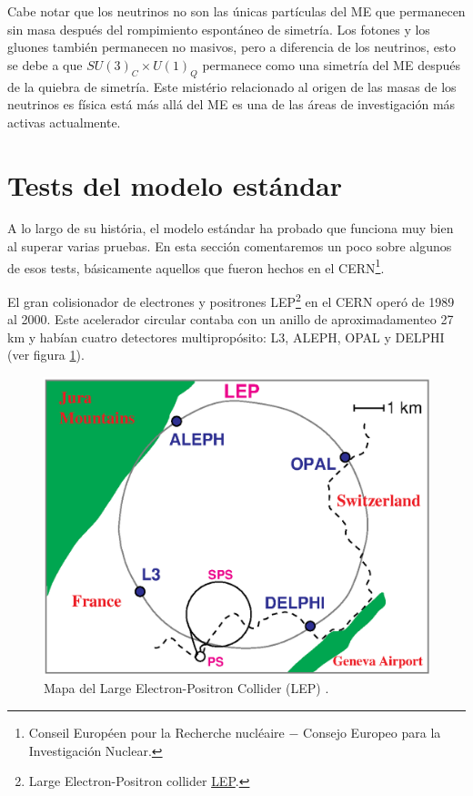  Cabe notar que los neutrinos no son las únicas partículas del ME que permanecen sin masa después del rompimiento espontáneo de simetría. Los fotones y los gluones también permanecen no masivos, pero a diferencia de los neutrinos, esto se debe a que $SU(3)_C \times U(1)_Q$ permanece como una simetría del ME después de la quiebra de simetría. Este mistério  relacionado al origen de las masas de los neutrinos es física está más allá del ME es una de las áreas de investigación más activas actualmente.



\section[\hspace{-0.19in} Tests del modelo estándar]{Tests del modelo estándar}

A lo largo de su história, el modelo estándar ha probado que funciona muy bien al superar varias pruebas. En esta sección comentaremos un poco sobre algunos de esos tests, básicamente aquellos que fueron hechos en el CERN\footnote{Conseil Européen pour la Recherche nucléaire $-$ Consejo Europeo para la Investigación Nuclear.}.

El gran colisionador de electrones y positrones LEP\footnote{Large Electron-Positron collider \href{https://home.cern/science/accelerators/large-electron-positron-collider}{LEP}.} en el CERN operó de 1989 al 2000. Este acelerador circular contaba con un anillo de aproximadamenteo 27 km y habían cuatro detectores multipropósito: L3, ALEPH, OPAL y DELPHI (ver figura \ref{LEPmap}).

\begin{figure}[h]
\centering
\includegraphics[scale=0.8]{Images/lep_map.eps}
\caption[Mapa del Large Electron-Positron Collider (LEP)]{Mapa del Large Electron-Positron Collider (LEP) \cite{aleph2005precision}.}
\label{LEPmap}
\end{figure}

